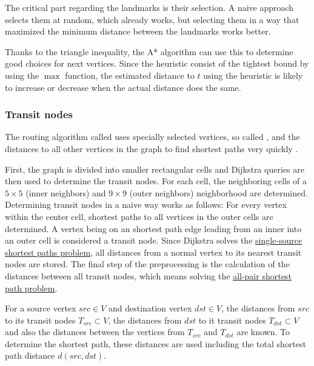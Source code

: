 			The critical part regarding the landmarks is their selection.
			A naive approach selects them at random, which already works, but selecting them in a way that maximized the minimum distance between the landmarks works better.
			
			Thanks to the triangle inequality, the A* algorithm can use this to determine good choices for next vertices.
			Since the heuristic consist of the tightest bound by using the $\max$ function, the estimated distance to $t$ using the heuristic is likely to increase or decrease when the actual distance does the same.
		
		\subsubsection{Transit nodes}
		\label{subsubsec:transit}
		
			The routing algorithm called  uses specially selected vertices, so called , and the distances to all other vertices in the graph to find shortest paths very quickly \cite{bast-transit}.
		
			First, the graph is divided into smaller rectangular cells and Dijkstra queries are then used to determine the transit nodes.
			For each cell, the neighboring cells of a $5 \times 5$ (inner neighbors) and $9 \times 9$ (outer neighbors) neighborhood are determined.
			Determining transit nodes in a naive way works as follows:
			For every vertex within the center cell, shortest paths to all vertices in the outer cells are determined.
			A vertex being on an shortest path edge leading from an inner into an outer cell is considered a transit node.
			Since Dijkstra solves the \hyperref[subsubsec:single-source-shortest-path]{single-source shortest paths problem}, all distances from a normal vertex to its nearest transit nodes are stored.
			The final step of the preprocessing is the calculation of the distances between all transit nodes, which means solving the \hyperref[subsubsec:all-pair-shortest-path]{all-pair shortest path problem}.
			
			For a source vertex $src \in V$ and destination vertex $dst \in V$, the distances from $src$ to its transit nodes $T_{src} \subset V$, the distances from $dst$ to it transit nodes $T_{dst} \subset V$ and also the distances between the vertices from $T_{src}$ and $T_{dst}$ are known.
			To determine the shortest path, these distances are used including the total shortest path distance $d(src, dst)$.
			
